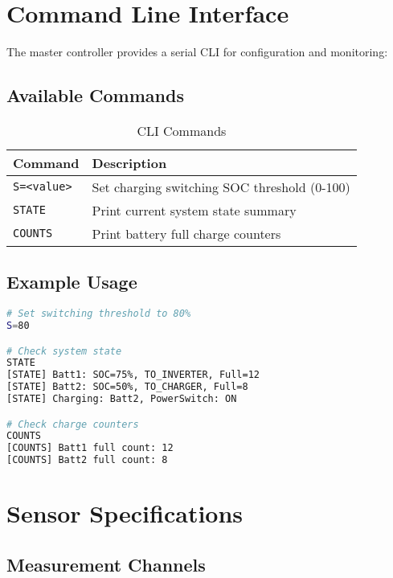 \documentclass[11pt,a4paper]{article}
\begin{document}
\section{Command Line Interface}

The master controller provides a serial CLI for configuration and monitoring:

\subsection{Available Commands}

\begin{table}[H]
\centering
\begin{tabular}{@{}ll@{}}
\toprule
Command & Description \\ \midrule
\texttt{S=<value>} & Set charging switching SOC threshold (0-100) \\
\texttt{STATE} & Print current system state summary \\
\texttt{COUNTS} & Print battery full charge counters \\ \bottomrule
\end{tabular}
\caption{CLI Commands}
\end{table}

\subsection{Example Usage}
\begin{lstlisting}[language=bash]
# Set switching threshold to 80%
S=80

# Check system state
STATE
[STATE] Batt1: SOC=75%, TO_INVERTER, Full=12
[STATE] Batt2: SOC=50%, TO_CHARGER, Full=8
[STATE] Charging: Batt2, PowerSwitch: ON

# Check charge counters
COUNTS
[COUNTS] Batt1 full count: 12
[COUNTS] Batt2 full count: 8
\end{lstlisting}

\section{Sensor Specifications}

\subsection{Measurement Channels}
\end{document}

